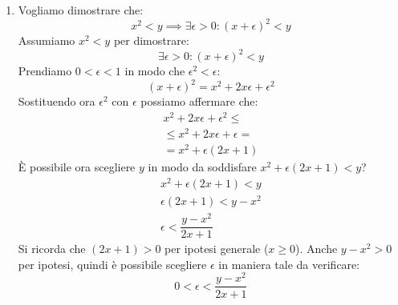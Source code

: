 {\begin{enumerate}[label=(\Alph*)]
	\item Vogliamo dimostrare che:
		\begin{equation*}
			x^2 < y \implies \exists \epsilon > 0: (x + \epsilon)^2 < y
		\end{equation*}
		Assumiamo $x^2 < y$ per dimostrare:
		\begin{equation*}
			\exists \epsilon > 0: (x + \epsilon)^2 < y
		\end{equation*}
		Prendiamo $0 < \epsilon < 1$ in modo che $\epsilon^2 < \epsilon$:
		\begin{equation*}
			(x+\epsilon)^2 = x^2 + 2x\epsilon + \epsilon^2
		\end{equation*}
		Sostituendo ora $\epsilon^2$ con $\epsilon$ possiamo affermare che:
		\begin{gather*}
			x^2 + 2x\epsilon + \epsilon^2 \leq\\
			\leq x^2 + 2x\epsilon + \epsilon =\\
			= x^2 + \epsilon(2x + 1)
		\end{gather*}
		È possibile ora scegliere $y$ in modo da soddisfare $x^2 + \epsilon(2x + 1) < y$?
		\begin{gather*}
			x^2 + \epsilon(2x + 1) < y\\
			\epsilon(2x + 1) < y - x^2\\
			\epsilon < \dfrac{y-x^2}{2x+1}
		\end{gather*}
		Si ricorda che $(2x+1) > 0$ per ipotesi generale ($x \geq 0$). Anche $y-x^2 > 0$ per ipotesi, quindi è possibile scegliere $\epsilon$ in maniera tale da verificare:
		\begin{equation*}
			0 < \epsilon < \dfrac{y-x^2}{2x+1}
		\end{equation*}


\end{enumerate}}
